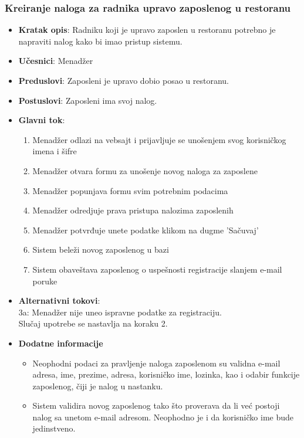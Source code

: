  \subsubsection{Kreiranje naloga za radnika upravo zaposlenog u restoranu}
\begin{itemize}
    \item \textbf{Kratak opis}:
   Radniku koji je upravo zaposlen u restoranu potrebno je napraviti nalog kako bi imao pristup sistemu.
    \item \textbf{Učesnici}:
    Menadžer
    \item \textbf{Preduslovi}:
    Zaposleni je upravo dobio posao u restoranu.
    \item \textbf{Postuslovi}:
    Zaposleni ima svoj nalog. 
    \item \textbf{Glavni tok}:
   \begin{enumerate}
        \item Menadžer odlazi na vebsajt i prijavljuje se unošenjem svog korisničkog imena i šifre
        \item Menadžer otvara formu za unošenje novog naloga za zaposlene
        \item Menadžer popunjava formu svim potrebnim podacima
        \item Menadžer odredjuje prava pristupa nalozima zaposlenih
        \item Menadžer potvrđuje unete podatke klikom na dugme 'Sačuvaj'
        \item Sistem beleži novog zaposlenog u bazi
        \item Sistem obaveštava zaposlenog o uspešnosti registracije slanjem e-mail poruke
\end{enumerate}
\end{itemize}
\begin {itemize}
\item \textbf {Alternativni tokovi}:\\
 3a: Menadžer nije uneo ispravne podatke za registraciju.\\
 Slučaj upotrebe se nastavlja na koraku 2.
 \end{itemize}
 \begin{itemize} 
     \item \textbf{Dodatne informacije}
 \begin{itemize}
     \item Neophodni podaci za pravljenje naloga zaposlenom su validna e-mail adresa, ime, prezime, adresa, korisničko ime, lozinka, kao i odabir funkcije zaposlenog, čiji je nalog u nastanku.
    \item Sistem validira novog zaposlenog tako što proverava da li već postoji nalog sa unetom e-mail adresom. Neophodno je i da korisničko ime bude jedinstveno.
 \end{itemize}
 \end{itemize}

